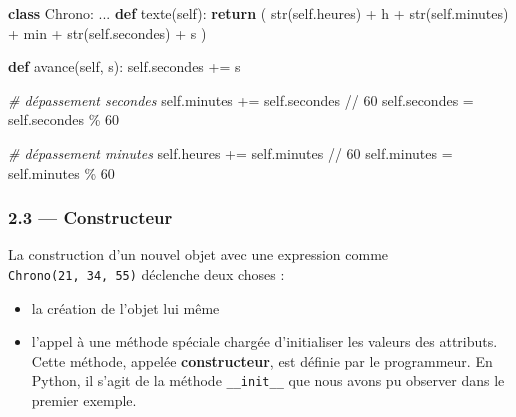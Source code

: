 \documentclass[a4paper,17pt]{extarticle}
\providecommand{\tightlist}{%
      \setlength{\itemsep}{0pt}\setlength{\parskip}{0pt}}
\newenvironment{Shaded}{}{}
\newcommand{\KeywordTok}[1]{\textcolor[rgb]{0.00,0.44,0.13}{\textbf{{#1}}}}
\newcommand{\DecValTok}[1]{\textcolor[rgb]{0.25,0.63,0.44}{{#1}}}
\newcommand{\StringTok}[1]{\textcolor[rgb]{0.25,0.44,0.63}{{#1}}}
\newcommand{\CommentTok}[1]{\textcolor[rgb]{0.38,0.63,0.69}{\textit{{#1}}}}
\newcommand{\NormalTok}[1]{{#1}}
\newcommand{\VariableTok}[1]{\textcolor[rgb]{0.10,0.09,0.49}{{#1}}}
\newcommand{\ControlFlowTok}[1]{\textcolor[rgb]{0.00,0.44,0.13}{\textbf{{#1}}}}
\newcommand{\OperatorTok}[1]{\textcolor[rgb]{0.40,0.40,0.40}{{#1}}}
\newcommand{\BuiltInTok}[1]{{#1}}
\begin{document}
\begin{Shaded}
\begin{Highlighting}[]
\KeywordTok{class}\NormalTok{ Chrono:}
\NormalTok{    ...}
    \KeywordTok{def}\NormalTok{ texte(}\VariableTok{self}\NormalTok{):}
        \ControlFlowTok{return}\NormalTok{ (  }\BuiltInTok{str}\NormalTok{(}\VariableTok{self}\NormalTok{.heures)   }\OperatorTok{+} \StringTok{\textquotesingle{}h \textquotesingle{}}
                \OperatorTok{+} \BuiltInTok{str}\NormalTok{(}\VariableTok{self}\NormalTok{.minutes)  }\OperatorTok{+} \StringTok{\textquotesingle{}min \textquotesingle{}}
                \OperatorTok{+} \BuiltInTok{str}\NormalTok{(}\VariableTok{self}\NormalTok{.secondes) }\OperatorTok{+} \StringTok{\textquotesingle{}s\textquotesingle{}}\NormalTok{   )}

    \KeywordTok{def}\NormalTok{ avance(}\VariableTok{self}\NormalTok{, s):}
        \VariableTok{self}\NormalTok{.secondes }\OperatorTok{+=}\NormalTok{ s}
        
        \CommentTok{\# dépassement secondes}
        \VariableTok{self}\NormalTok{.minutes }\OperatorTok{+=} \VariableTok{self}\NormalTok{.secondes }\OperatorTok{//} \DecValTok{60}
        \VariableTok{self}\NormalTok{.secondes }\OperatorTok{=} \VariableTok{self}\NormalTok{.secondes }\OperatorTok{\%}  \DecValTok{60}

        \CommentTok{\# dépassement minutes}
        \VariableTok{self}\NormalTok{.heures }\OperatorTok{+=} \VariableTok{self}\NormalTok{.minutes }\OperatorTok{//} \DecValTok{60}
        \VariableTok{self}\NormalTok{.minutes }\OperatorTok{=} \VariableTok{self}\NormalTok{.minutes }\OperatorTok{\%}  \DecValTok{60}
\end{Highlighting}
\end{Shaded}

    \hypertarget{constructeur}{%
\subsubsection{2.3 --- Constructeur}\label{constructeur}}

    La construction d'un nouvel objet avec une expression comme
\texttt{Chrono(21,\ 34,\ 55)} déclenche deux choses :

\begin{itemize}
\tightlist
\item
  la création de l'objet lui même
\item
  l'appel à une méthode spéciale chargée d'initialiser les valeurs des
  attributs. Cette méthode, appelée \textbf{constructeur}, est définie
  par le programmeur. En Python, il s'agit de la méthode
  \texttt{\_\_init\_\_} que nous avons pu observer dans le premier
  exemple.
\end{itemize}
\end{document}
